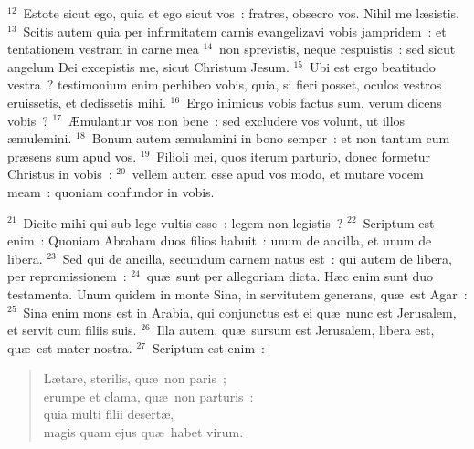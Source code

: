 ${}^{12}$~Estote sicut ego, quia et ego sicut vos~: fratres, obsecro vos. Nihil me l\ae sistis.
${}^{13}$~Scitis autem quia per infirmitatem carnis evangelizavi vobis jampridem~: et tentationem vestram in carne mea
${}^{14}$~non sprevistis, neque respuistis~: sed sicut angelum Dei excepistis me, sicut Christum Jesum.
${}^{15}$~Ubi est ergo beatitudo vestra~? testimonium enim perhibeo vobis, quia, si fieri posset, oculos vestros eruissetis, et dedissetis mihi.
${}^{16}$~Ergo inimicus vobis factus sum, verum dicens vobis~?
${}^{17}$~\AE mulantur vos non bene~: sed excludere vos volunt, ut illos \ae mulemini.
${}^{18}$~Bonum autem \ae mulamini in bono semper~: et non tantum cum pr\ae sens sum apud vos.
${}^{19}$~Filioli mei, quos iterum parturio, donec formetur Christus in vobis~:
${}^{20}$~vellem autem esse apud vos modo, et mutare vocem meam~: quoniam confundor in vobis.


${}^{21}$~Dicite mihi qui sub lege vultis esse~: legem non legistis~?
${}^{22}$~Scriptum est enim~: Quoniam Abraham duos filios habuit~: unum de ancilla, et unum de libera.
${}^{23}$~Sed qui de ancilla, secundum carnem natus est~: qui autem de libera, per repromissionem~:
${}^{24}$~qu\ae\ sunt per allegoriam dicta. H\ae c enim sunt duo testamenta. Unum quidem in monte Sina, in servitutem generans, qu\ae\ est Agar~:
${}^{25}$~Sina enim mons est in Arabia, qui conjunctus est ei qu\ae\ nunc est Jerusalem, et servit cum filiis suis.
${}^{26}$~Illa autem, qu\ae\ sursum est Jerusalem, libera est, qu\ae\ est mater nostra.
${}^{27}$~Scriptum est enim~: \begin{flushleft}\begin{verse}L\ae tare, sterilis, qu\ae\ non paris~;\\ erumpe et clama, qu\ae\ non parturis~:\\ quia multi filii desert\ae ,\\ magis quam ejus qu\ae\ habet virum.\end{verse}\end{flushleft}


